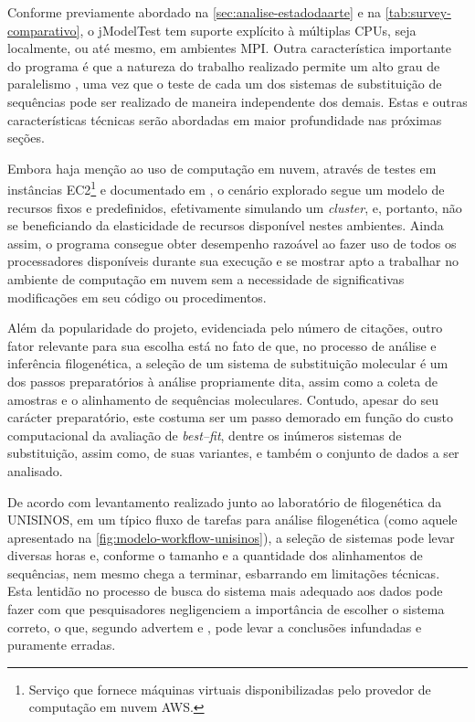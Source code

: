 \documentclass[english,brazilian]{UNISINOSmonografia} %
\begin{document}
Conforme previamente abordado na \autoref{sec:analise-estadodaarte} e na \autoref{tab:survey-comparativo}, o jModelTest tem suporte explícito à múltiplas CPUs, seja localmente, ou até mesmo, em ambientes MPI.
Outra característica importante do programa é que a natureza do trabalho realizado permite um alto grau de paralelismo \cite{Keane2006a}, uma vez que o teste de cada um dos sistemas de substituição de sequências pode ser realizado de maneira independente dos demais.
Estas e outras características técnicas serão abordadas em maior profundidade nas próximas seções.


Embora haja menção ao uso de computação em nuvem, através de testes em instâncias 
EC2\footnote{
	Serviço que fornece máquinas virtuais disponibilizadas pelo provedor de computação em nuvem AWS.
} 
e documentado em , o cenário explorado segue um modelo de recursos fixos e predefinidos, efetivamente simulando um \textit{cluster}, e, portanto, não se beneficiando da elasticidade de recursos disponível nestes ambientes.
Ainda assim, o programa consegue obter desempenho razoável ao fazer uso de todos os processadores disponíveis durante sua execução e se mostrar apto a trabalhar no ambiente de computação em nuvem sem a necessidade de significativas modificações em seu código ou procedimentos.


Além da popularidade do projeto, evidenciada pelo número de citações, outro fator relevante para sua escolha está no fato de que, no processo de análise e inferência filogenética, a seleção de um sistema de substituição molecular é um dos passos preparatórios à análise propriamente dita, assim como a coleta de amostras e o alinhamento de sequências moleculares.
Contudo, apesar do seu carácter preparatório, este costuma ser um passo demorado em função do custo computacional da avaliação de \textit{best--fit}, dentre os inúmeros sistemas de substituição, assim como, de suas variantes, e também o conjunto de dados a ser analisado.


De acordo com levantamento realizado junto ao laboratório de filogenética da UNISINOS, em um típico fluxo de tarefas para análise filogenética (como aquele apresentado na \autoref{fig:modelo-workflow-unisinos}), a seleção de sistemas pode levar diversas horas e, conforme o tamanho e a quantidade dos alinhamentos de sequências, nem mesmo chega a terminar, esbarrando em limitações técnicas.
Esta lentidão no processo de busca do sistema mais adequado aos dados pode fazer com que pesquisadores negligenciem a importância de escolher o sistema correto, o que, segundo advertem  e , pode levar a conclusões infundadas e puramente erradas.
\end{document}
